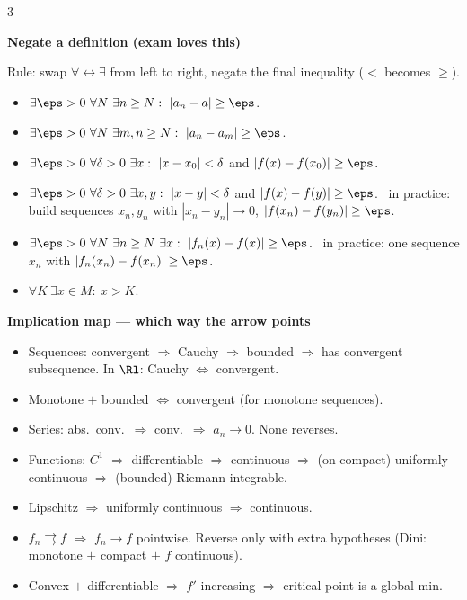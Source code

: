 \begin{multicols}{3}
{\columnbreak

\textbf{\sffamily\color{subText}Negate a definition (exam loves this)}\par\nobreak\vspace{1pt}
Rule: swap $\forall\leftrightarrow\exists$ from left to right, negate the final inequality ($<$ becomes $\ge$).
\begin{itemize}[noitemsep,topsep=1pt,leftmargin=*]
\item {} $\exists\eps>0\ \forall N\ \exists n\ge N:\ |a_n-a|\ge\eps$.
\item {} $\exists\eps>0\ \forall N\ \exists m,n\ge N:\ |a_n-a_m|\ge\eps$.
\item {} $\exists\eps>0\ \forall\delta>0\ \exists x:\ |x-x_0|<\delta$ and $|f(x)-f(x_0)|\ge\eps$.
\item {} $\exists\eps>0\ \forall\delta>0\ \exists x,y:\ |x-y|<\delta$ and $|f(x)-f(y)|\ge\eps$.
\ra\ in practice: build sequences $x_n,y_n$ with $|x_n-y_n|\to0$, $|f(x_n)-f(y_n)|\ge\eps$.
\item {} $\exists\eps>0\ \forall N\ \exists n\ge N\ \exists x:\ |f_n(x)-f(x)|\ge\eps$.
\ra\ in practice: one sequence $x_n$ with $|f_n(x_n)-f(x_n)|\ge\eps$.
\item {} $\forall K\ \exists x\in M:\ x>K$.
\end{itemize}

\vspace{2pt}
\textbf{\sffamily\color{subText}Implication map --- which way the arrow points}\par\nobreak\vspace{1pt}
\begin{itemize}[noitemsep,topsep=1pt,leftmargin=*]
\item Sequences: convergent $\Rightarrow$ Cauchy $\Rightarrow$ bounded $\Rightarrow$ has convergent subsequence. In $\Rl$: Cauchy $\Leftrightarrow$ convergent.
\item Monotone $+$ bounded $\Leftrightarrow$ convergent (for monotone sequences).
\item Series: abs.\ conv.\ $\Rightarrow$ conv.\ $\Rightarrow$ $a_n\to0$. None reverses.
\item Functions: $C^1$ $\Rightarrow$ differentiable $\Rightarrow$ continuous $\Rightarrow$ (on compact) uniformly continuous $\Rightarrow$ (bounded) Riemann integrable.
\item Lipschitz $\Rightarrow$ uniformly continuous $\Rightarrow$ continuous.
\item $f_n\rightrightarrows f$ $\Rightarrow$ $f_n\to f$ pointwise. Reverse only with extra hypotheses (Dini: monotone $+$ compact $+$ $f$ continuous).
\item Convex $+$ differentiable $\Rightarrow$ $f'$ increasing $\Rightarrow$ critical point is a global min.
\end{itemize}

}
\end{multicols}
